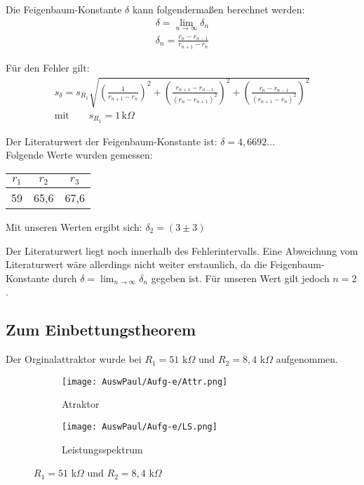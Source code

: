 Die Feigenbaum-Konstante \(\delta\) kann folgendermaßen berechnet werden: 
\begin{align}
    \delta = \lim_{n \to \infty} \delta_n \\
    \delta_n = \frac{r_n - r_{n-1}}{r_{n+1} -r_n}
\end{align}

Für den Fehler gilt: 
\begin{align}
    s_{\delta} = s_{R_1} \sqrt{(\frac{1}{r_{n+1}-r_n})^2 + (\frac{r_{n+1}-r_{n-1}}{(r_n - r_{n+1})^2})^2 + (\frac{r_n - r_{n-1}}{(r_{n+1}-r_n)^2})^2}\\
    \text{mit} \qquad s_{R_1} = 1 \, \text{k}\Omega
\end{align}

Der Literaturwert der Feigenbaum-Konstante ist: \(\delta = 4,6692...\)\\

Folgende Werte wurden gemessen: \\
\begin{tabular}{c c c}
    $r_1$ & $r_2$ & $r_3$\\
    \hline
    59 & 65,6 & 67,6
\end{tabular}

Mit unseren Werten ergibt sich: \(\delta_2 = (3 \pm 3)\)

Der Literaturwert liegt noch innerhalb des Fehlerintervalls. Eine Abweichung vom Literaturwert wäre allerdings nicht weiter erstaunlich, da die Feigenbaum-Konstante durch \( \delta = \lim_{n \to \infty} \delta_n\) gegeben ist. Für unseren Wert gilt jedoch \( n=2\).

\newpage
\subsection{Zum Einbettungstheorem}

Der Orginalattraktor wurde bei $R_1 = 51$ k$\Omega$ und $R_2 = 8,4$ k$\Omega$ aufgenommen.

\begin{figure}[h]
    \centering
    \begin{subfigure}[b]{0.45\textwidth}
        \centering
        \texttt{[image: AuswPaul/Aufg-e/Attr.png]}
        \caption{Atraktor}
    \end{subfigure}
    \hfill
    \begin{subfigure}[b]{0.45\textwidth}
        \centering
        \texttt{[image: AuswPaul/Aufg-e/LS.png]}
        \caption{Leistungsspektrum}
    \end{subfigure}
    \caption{$R_1 = 51$ k$\Omega$ und $R_2 = 8,4$ k$\Omega$}
\end{figure}

